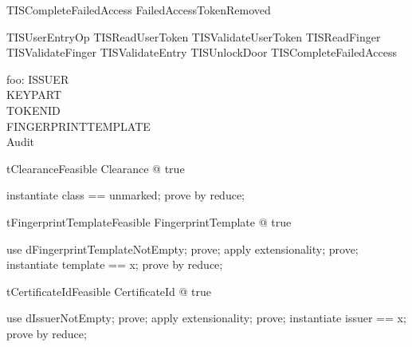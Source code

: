 \begin{zed}
TISCompleteFailedAccess  FailedAccessTokenRemoved \lor  [WaitingTokenRemoval | tkstatus = waitingRemoveTokenFail]
\end{zed}

\begin{zed}
TISUserEntryOp  TISReadUserToken \lor  TISValidateUserToken \lor  TISReadFinger \lor  TISValidateFinger \lor  TISValidateEntry \lor  TISUnlockDoor \lor  TISCompleteFailedAccess
\end{zed}

\begin{axdef}
  foo: \nat
\where
    ISSUER \neq  \emptyset\\
    KEYPART \neq  \emptyset\\
    TOKENID \neq  \emptyset\\
    FINGERPRINTTEMPLATE \neq  \emptyset \\
   Audit \neq \emptyset
\end{axdef}

\begin{theorem}{tClearanceFeasible}
\exists  Clearance @ true
\end{theorem}

\begin{zproof}[tClearanceFeasible]
instantiate class == unmarked;
prove by reduce;
\end{zproof}

\begin{theorem}{tFingerprintTemplateFeasible}
\exists  FingerprintTemplate @ true
\end{theorem}

\begin{zproof}[tFingerprintTemplateFeasible]
use dFingerprintTemplateNotEmpty;
prove;
apply extensionality;
prove;
instantiate template == x;
prove by reduce;
\end{zproof}

\begin{theorem}{tCertificateIdFeasible}
\exists  CertificateId @ true
\end{theorem}

\begin{zproof}[tCertificateIdFeasible]
use dIssuerNotEmpty;
prove;
apply extensionality;
prove;
instantiate issuer == x;
prove by reduce;
\end{zproof}

